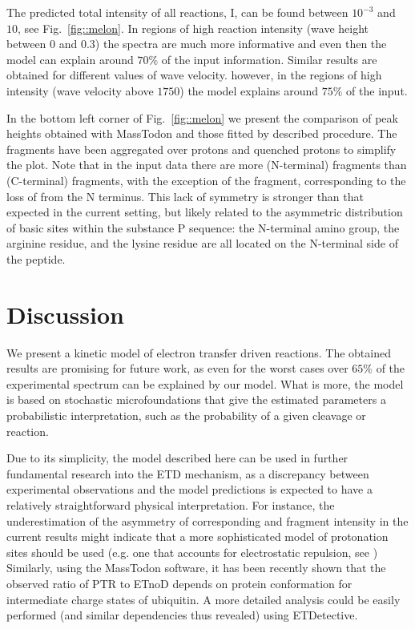 \documentclass{llncs}
\begin{document}
        The predicted total intensity of all reactions, I, can be found between $10^{-3}$ and $10$, see Fig.~\ref{fig::melon}. In regions of high reaction intensity (wave height between $0$ and $0.3$) the spectra are much more informative and even then the model can explain around $70\%$ of the input information. Similar results are obtained for different values of wave velocity. however, in the regions of high intensity (wave velocity above $1750$) the model explains around $75\%$ of the input.

        In the bottom left corner of Fig.~\ref{fig::melon} we present the comparison of peak heights obtained with MassTodon and those fitted by described procedure. The fragments have been aggregated over protons and quenched protons to simplify the plot. Note that in the input data there are more (N-terminal)  fragments than (C-terminal)  fragments, with the exception of the  fragment, corresponding to the loss of  from the N terminus. This lack of symmetry is stronger than that expected in the current setting, but likely related to the asymmetric distribution of basic sites within the substance P sequence: the N-terminal amino group, the arginine residue, and the lysine residue are all located on the N-terminal side of the peptide.

\section{Discussion}
        We present a kinetic model of electron transfer driven reactions. The obtained results are promising for future work, as even for the worst cases over $65\%$ of the experimental spectrum can be explained by our model. What is more, the model is based on stochastic microfoundations that give the estimated parameters a probabilistic interpretation, such as the probability of a given cleavage or reaction.

        Due to its simplicity, the model described here can be used in further fundamental research into the ETD mechanism, as a discrepancy between experimental observations and the model predictions is expected to have a relatively straightforward physical interpretation. For instance, the underestimation of the asymmetry of corresponding  and  fragment intensity in the current results might indicate that a more sophisticated model of protonation sites should be used (e.g. one that accounts for electrostatic repulsion, see \cite{Morrison2016-wc}) Similarly, using the MassTodon software, it has been recently shown \cite{Lermyte2017-zt} that the observed ratio of PTR to ETnoD depends on protein conformation for intermediate charge states of ubiquitin. A more detailed  analysis could be easily performed (and similar dependencies thus revealed) using ETDetective.
\end{document}
